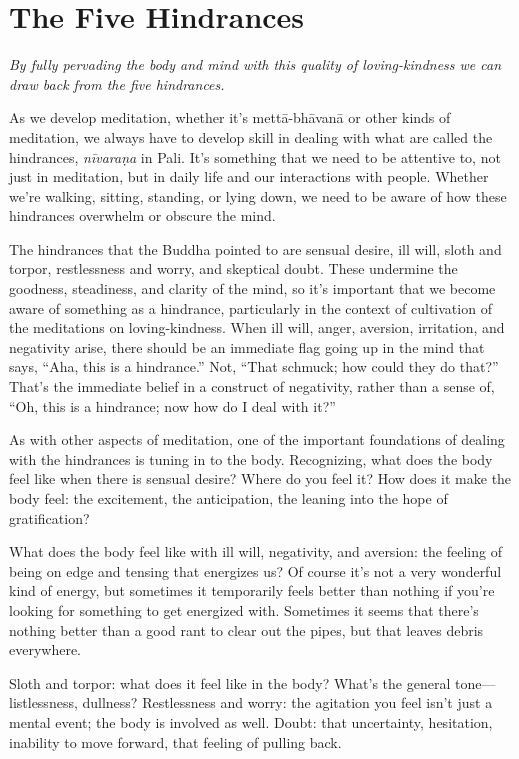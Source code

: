 \chapter{The Five Hindrances}

\epigraph{\emph{By fully pervading the body and mind with this quality
of loving-kindness we can draw back from the five hindrances.}}{}

As we develop meditation, whether it’s mettā-bhāvanā or other kinds of
meditation, we always have to develop skill in dealing with what are
called the hindrances, \emph{nīvaraṇa} in Pali. It’s something that we
need to be attentive to, not just in meditation, but in daily life and
our interactions with people. Whether we’re walking, sitting, standing,
or lying down, we need to be aware of how these hindrances overwhelm or
obscure the mind.

The hindrances that the Buddha pointed to are sensual desire, ill will,
sloth and torpor, restlessness and worry, and skeptical doubt. These
undermine the goodness, steadiness, and clarity of the mind, so it’s
important that we become aware of something as a hindrance, particularly
in the context of cultivation of the meditations on loving-kindness.
When ill will, anger, aversion, irritation, and negativity arise, there
should be an immediate flag going up in the mind that says, “Aha, this
is a hindrance.” Not, “That schmuck; how could they do that?” That’s the
immediate belief in a construct of negativity, rather than a sense of,
“Oh, this is a hindrance; now how do I deal with it?”

As with other aspects of meditation, one of the important foundations of
dealing with the hindrances is tuning in to the body. Recognizing, what
does the body feel like when there is sensual desire? Where do you feel
it? How does it make the body feel: the excitement, the anticipation,
the leaning into the hope of gratification?

What does the body feel like with ill will, negativity, and aversion:
the feeling of being on edge and tensing that energizes us? Of course
it’s not a very wonderful kind of energy, but sometimes it temporarily
feels better than nothing if you’re looking for something to get
energized with. Sometimes it seems that there’s nothing better than a
good rant to clear out the pipes, but that leaves debris everywhere.

Sloth and torpor: what does it feel like in the body? What’s the general
tone—listlessness, dullness? Restlessness and worry: the agitation you
feel isn’t just a mental event; the body is involved as well. Doubt:
that uncertainty, hesitation, inability to move forward, that feeling of
pulling back.

